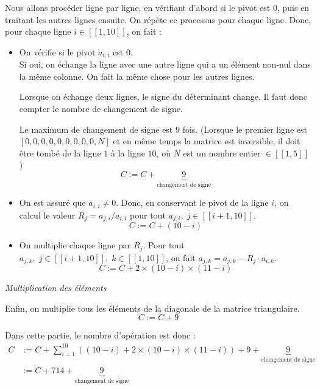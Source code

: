 \documentclass{article}
\begin{document}
Nous allons procéder ligne par ligne, en vérifiant d'abord si le pivot est 0, puis en traitant les autres lignes ensuite. On répète ce processus pour chaque ligne. Donc, pour chaque ligne $i \in [\![1, 10]\!]$, on fait :
\begin{itemize}
    \item On vérifie si le pivot $a_{i, i}$ est 0. \\
        Si oui, on échange la ligne avec une autre ligne qui a un élément non-nul dans la même colonne. On fait la même chose pour les autres lignes.
        \begin{tcolorbox}
            Lorsque on échange deux lignes, le signe du déterminant change. Il faut donc compter le nombre de changement de signe.

            Le maximum de changement de signe est $9$ fois. (Lorsque le premier ligne est $[0, 0, 0, 0, 0, 0, 0, 0, 0, N]$ et en même temps la matrice est inversible, il doit être tombé de la ligne $1$ à la ligne $10$, où $N$ est un nombre entier $\in [\![1,5]\!]$)
            \[
                C := C + \underbrace{9}_{\text{changement de signe}}
            \]
            
        \end{tcolorbox}
    \item On est assuré que $a_{i, i} \ne 0$. Donc, en conservant le pivot de la ligne $i$, on calcul le valeur $R_j = a_{j,i}/a_{i,i}$ pour tout $a_{j, i},\; j \in [\![i+1, 10]\!]$. \[
    C := C + (10-i)
    \]
    
    \item On multiplie chaque ligne par $R_j$. Pour tout $a_{j, k},\; j \in [\![i+1, 10]\!],\; k \in [\![1, 10]\!]$, on fait $a_{j, k} = a_{j, k} - R_j \cdot a_{i, k}$. \[
    C := C + 2 \times  (10 - i) \times  (11 -i)
    \]
\end{itemize}

\noindent\textit{Multiplication des éléments}

Enfin, on multiplie tous les éléments de la diagonale de la matrice triangulaire. \[
C := C + 9
\]
\begin{tcolorbox}
Dans cette partie, le nombre d'opération est donc :
\begin{align*}
    C &:= C + \sum_{i=1}^{10} \left( (10-i) + 2 \times  (10 - i) \times  (11 -i) \right) + 9 + \underbrace{9}_{\text{changement de signe}} \\
      &:= C + 714 + \underbrace{9}_{\text{changement de signe}}
\end{align*}
    
\end{tcolorbox}
\end{document}
